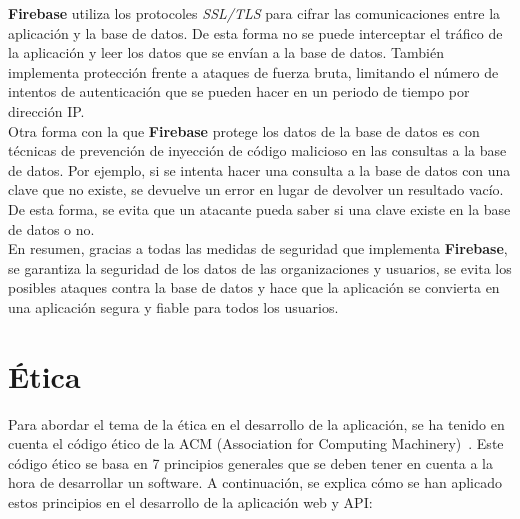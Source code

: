 \textbf{Firebase} utiliza los protocoles \textit{SSL/TLS} para cifrar las comunicaciones entre la aplicación y la base de datos. De
esta forma no se puede interceptar el tráfico de la aplicación y leer los datos que se envían a la base de datos. También
implementa protección frente a ataques de fuerza bruta, limitando el número de intentos de autenticación que se pueden hacer
en un periodo de tiempo por dirección IP. \\

Otra forma con la que \textbf{Firebase} protege los datos de la base de datos es con técnicas de prevención de inyección
de código malicioso en las consultas a la base de datos. Por ejemplo, si se intenta hacer una consulta a la base de datos
con una clave que no existe, se devuelve un error en lugar de devolver un resultado vacío. De esta forma, se evita que
un atacante pueda saber si una clave existe en la base de datos o no. \\

En resumen, gracias a todas las medidas de seguridad que implementa \textbf{Firebase}, se garantiza la seguridad de los
datos de las organizaciones y usuarios, se evita los posibles ataques contra la base de datos y hace que la aplicación
se convierta en una aplicación segura y fiable para todos los usuarios.

\section{Ética}\label{sec:etica}

Para abordar el tema de la ética en el desarrollo de la aplicación, se ha tenido en cuenta el código ético de la ACM (Association
for Computing Machinery)~\cite{acm-code-of-ethics}. Este código ético se basa en 7 principios generales que se deben tener en cuenta
a la hora de desarrollar un software. A continuación, se explica cómo se han aplicado estos principios en el desarrollo
de la aplicación web y API:

